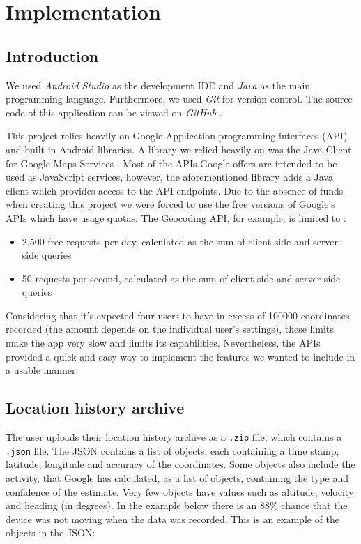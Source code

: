 \documentclass[12p]{article}
\begin{document}
    
\newpage
\section{Implementation} \label{sec:Implementation}

    \subsection{Introduction}
    We used \textit{Android Studio} as the development IDE and \textit{Java} as the main programming language. Furthermore, we used \textit{Git} for version control. The source code of this application can be viewed on \textit{GitHub} \cite{repo}.
    
    This project relies heavily on Google Application programming interfaces (API) \cite{GoogleDevProducts} and built-in Android libraries. A library we relied heavily on was the Java Client for Google Maps Services \cite{JavaGoogleAPI}. Most of the APIs Google offers are intended to be used as JavaScript services, however, the aforementioned library adds a Java client which provides access to the API endpoints.
    Due to the absence of funds when creating this project we were forced to use the free versions of Google's APIs which have usage quotas. The Geocoding API, for example, is limited to
    \cite{GeoCodingAPILimits}:
    
    \begin{itemize}
        \item 2,500 free requests per day, calculated as the sum of client-side and server-side queries
        \item 50 requests per second, calculated as the sum of client-side and server-side queries
    \end{itemize}
    
    Considering that it's expected four users to have in excess of 100000 coordinates recorded (the amount depends on the individual user's settings), these limits make the app very slow and limits its capabilities. Nevertheless, the APIs provided a quick and easy way to implement the features we wanted to include in a usable manner.
    
    \subsection{Location history archive} \label{sec:JsonFile}
    The user uploads their location history archive as a \texttt{.zip} \cite{zip} file, which contains a \texttt{.json} \cite{json} file. The JSON contains a list of objects, each containing a time stamp, latitude, longitude and accuracy of the coordinates. Some objects also include the activity, that Google has calculated, as a list of objects, containing the type and confidence of the estimate. Very few objects have values such as altitude, velocity and heading (in degrees). In the example below there is an 88\% chance that the device was not moving when the data was recorded. This is an example of the objects in the JSON: 
    
\end{document}

